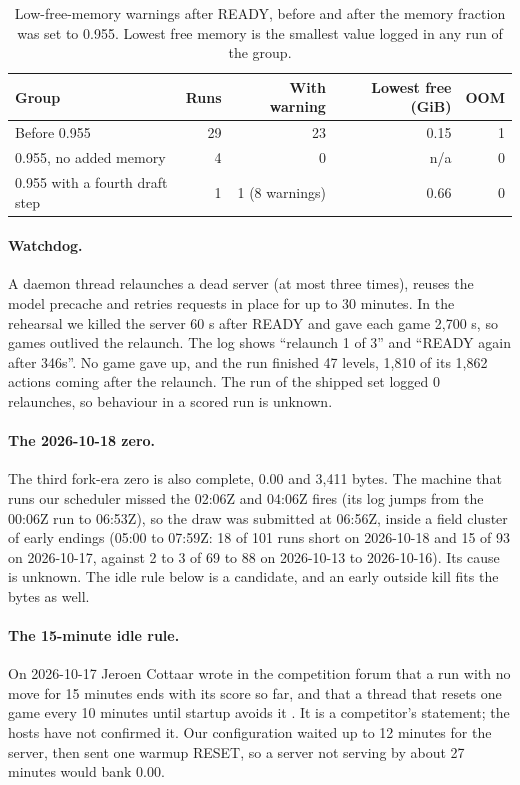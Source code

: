 \begin{table}[!htb]
\caption{Low-free-memory warnings after READY, before and after the memory fraction was set to 0.955. Lowest free memory is the smallest value logged in any run of the group.}\label{tab:oom}
\centering\footnotesize
\begin{tabular}{@{}lrrrr@{}}
\toprule
Group & Runs & With warning & Lowest free (GiB) & OOM \\
\midrule
Before 0.955 & 29 & 23 & 0.15 & 1 \\ %
0.955, no added memory & 4 & 0 & n/a & 0 \\ %
0.955 with a fourth draft step & 1 & 1 (8 warnings) & 0.66 & 0 \\ %
\bottomrule
\end{tabular}
\end{table}

\paragraph{Watchdog.}
A daemon thread relaunches a dead server (at most three times), reuses the model precache and retries requests in place for up to 30 minutes. %
In the rehearsal we killed the server 60 s after READY and gave each game 2,700 s, so games outlived the relaunch. %
The log shows ``relaunch 1 of 3'' and ``READY again after 346s''. No game gave up, and the run finished 47 levels, 1,810 of its 1,862 actions coming after the relaunch. %
The run of the shipped set logged 0 relaunches, so behaviour in a scored run is unknown. %



\paragraph{The 2026-10-18 zero.}
The third fork-era zero is also complete, 0.00 and 3,411 bytes. %
The machine that runs our scheduler missed the 02:06Z and 04:06Z fires (its log jumps from the 00:06Z run to 06:53Z), so the draw was submitted at 06:56Z, inside a field cluster of early endings (05:00 to 07:59Z: 18 of 101 runs short on 2026-10-18 and 15 of 93 on 2026-10-17, against 2 to 3 of 69 to 88 on 2026-10-13 to 2026-10-16). %
Its cause is unknown. The idle rule below is a candidate, and an early outside kill fits the bytes as well. %

\paragraph{The 15-minute idle rule.}
On 2026-10-17 Jeroen Cottaar wrote in the competition forum that a run with no move for 15 minutes ends with its score so far, and that a thread that resets one game every 10 minutes until startup avoids it \citep{cottaar2026forum750173}. It is a competitor's statement; the hosts have not confirmed it. %
Our configuration waited up to 12 minutes for the server, then sent one warmup RESET, so a server not serving by about 27 minutes would bank 0.00. %

